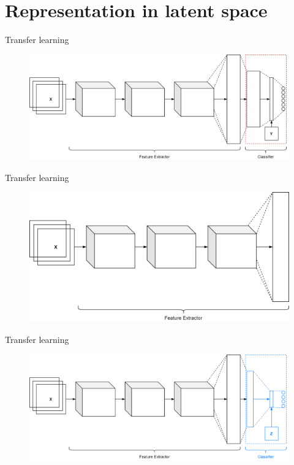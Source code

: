 \section{Representation in latent space}
\begin{frame}{Transfer learning}
	\begin{center}
		\begin{figure}
			\includegraphics[width=1\textwidth]{figures/deep_cnn_transfer_learning_1}
		\end{figure}
	\end{center}
\end{frame}
\begin{frame}{Transfer learning}
	\begin{center}
		\begin{figure}
			\includegraphics[width=1\textwidth]{figures/deep_cnn_transfer_learning_2}
		\end{figure}
	\end{center}
\end{frame}
\begin{frame}{Transfer learning}
	\begin{center}
		\begin{figure}
			\includegraphics[width=1\textwidth]{figures/deep_cnn_transfer_learning_3}
		\end{figure}
	\end{center}
\end{frame}
